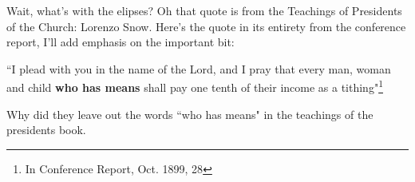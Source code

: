 Wait, what's with the elipses? Oh that quote is from the Teachings of Presidents of
the Church: Lorenzo Snow. Here's the quote in its entirety from the conference
report, I'll add emphasis on the important bit:

\begin{displayquote}
``I plead with you in the name of the Lord, and I pray that every man, woman and child 
\textbf{who has means} shall pay one tenth of their income as a tithing"\footnote{
In Conference Report, Oct. 1899, 28
}
\end{displayquote}

Why did they leave out the words ``who has means" in the teachings of the presidents
book.